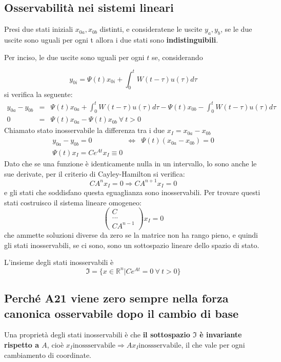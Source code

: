\documentclass{article}
\begin{document}
\subsection{Osservabilità nei sistemi lineari}
Presi due stati iniziali $x_{0a},x_{0b}$ distinti, e consideratene le uscite $y_a,y_b$, se le due uscite 
sono uguali per ogni t allora i due stati sono \textbf{indistinguibili}.

Per inciso, le due uscite sono uguali per ogni $t$ se,
considerando 

\[ y_{0i} = \Psi(t)x_{0i} + \int_{0}^{t} W(t-\tau) u(\tau) d\tau \]
si verifica la seguente:
\[
    \begin{array}{rcl}
        y_{0a}-y_{0b} & = & \Psi(t)x_{0a} + \int_{0}^{t} W(t-\tau) u(\tau) d\tau - \Psi(t)x_{0b} - \int_{0}^{t} W(t-\tau) u(\tau) d\tau \\
        0 & = & \Psi(t)x_{0a} - \Psi(t)x_{0b} \  \forall\   t>0
    \end{array}    
\]
Chiamato stato inosservabile la differenza tra i due $x_I = x_{0a}-x_{0b}$
\[
    \begin{array}{rcl}
        y_{0a}-y_{0b}  = 0 & \Longleftrightarrow & \Psi(t)(x_{0a} -x_{0b} ) = 0  \\
        \Psi(t)x_I = C e^{At}x_I \equiv 0
    \end{array}    
\]
Dato che se una funzione è identicamente nulla in un intervallo, lo sono anche
le sue derivate, per il criterio di Cayley-Hamilton si verifica:
\[ C A^n x_I = 0 \Longrightarrow C A^{n+1} x_I = 0 \]
e gli stati che soddisfano questa eguaglianza sono inosservabili.
Per trovare questi stati costruisco il sistema lineare omogeneo:
\[\begin{pmatrix}C\\...\\CA^{n-1}\end{pmatrix}x_I = 0\]
che ammette soluzioni diverse da zero se la matrice non ha rango pieno, e quindi gli stati inosservabili,
se ci sono, sono un sottospazio lineare dello spazio di stato.

L'insieme degli stati inosservabili è 
\[\mathfrak{I} = \{ x\in\mathbb{R}^n | Ce^{At}=0\ \forall\ t > 0\}\]

\subsection{Perché A21 viene zero sempre nella forza canonica osservabile dopo il cambio di base }

Una proprietà degli stati inosservabili è che
\textbf{ il sottospazio $\mathfrak{I}$ è invariante rispetto a $A$},
cioè $x_I \text{inossservabile} \Longrightarrow Ax_I \text{inossservabile}$, il che vale 
per ogni cambiamento di coordinate.
\end{document}
